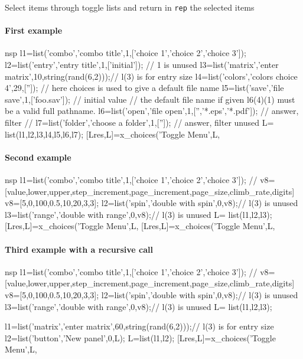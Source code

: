 \begin{mandescription}
  Select items through toggle lists and return in \verb!rep! the selected items
\end{mandescription}
\begin{examples}
\paragraph{First example}

\begin{mintednsp}{nsp}
l1=list('combo','combo title',1,['choice 1','choice 2','choice 3']);
l2=list('entry','entry title',1,['initial']); // 1 is unused 
l3=list('matrix','enter matrix',10,string(rand(6,2)));// l(3) is for entry size
l4=list('colors','colors choice 4',29,['']);
// here choices is used to give a default file name 
l5=list('save','file save',1,['foo.sav']); // initial value 
// the default file name if given l6(4)(1) must be a valid full pathname.
l6=list('open','file open',1,['','*.eps','*.pdf']); // answer, filter 
// 
l7=list('folder','choose a folder',1,['']); // answer, filter unused 
L= list(l1,l2,l3,l4,l5,l6,l7);
[Lres,L]=x_choices('Toggle Menu',L,%
\end{mintednsp}

\paragraph{Second example}

\begin{mintednsp}{nsp}
l1=list('combo','combo title',1,['choice 1','choice 2','choice 3']);
// v8=[value,lower,upper,step_increment,page_increment,page_size,climb_rate,digits] 
v8=[5,0,100,0.5,10,20,3,3];    
l2=list('spin','double with spin',0,v8);// l(3) is unused
l3=list('range','double with range',0,v8);// l(3) is unused
L= list(l1,l2,l3);
[Lres,L]=x_choices('Toggle Menu',L,%
[Lres,L]=x_choices('Toggle Menu',L,%
\end{mintednsp}

\paragraph{Third example with a recursive call}

\begin{mintednsp}{nsp}
l1=list('combo','combo title',1,['choice 1','choice 2','choice 3']);
// v8=[value,lower,upper,step_increment,page_increment,page_size,climb_rate,digits] 
v8=[5,0,100,0.5,10,20,3,3];    
l2=list('spin','double with spin',0,v8);// l(3) is unused
l3=list('range','double with range',0,v8);// l(3) is unused
L= list(l1,l2,l3);
      
l1=list('matrix','enter matrix',60,string(rand(6,2)));// l(3) is for entry size
l2=list('button','New panel',0,L);
L=list(l1,l2);
[Lres,L]=x_choices('Toggle Menu',L,%
\end{mintednsp}
\end{examples}

